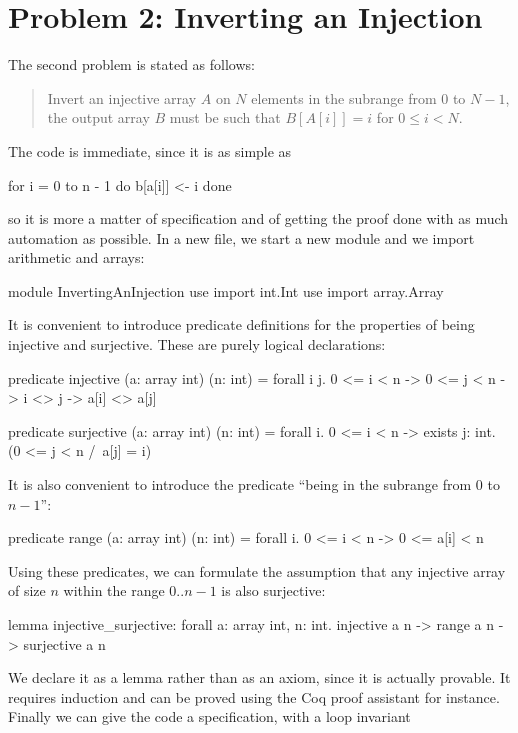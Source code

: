 \section{Problem 2: Inverting an Injection}

The second problem is stated as follows:
\begin{quote}
  Invert an injective array $A$ on $N$ elements in the
  subrange from $0$ to $N - 1$, \ie the output array $B$ must be
  such that $B[A[i]] = i$ for $0 \le i < N$.
\end{quote}
The code is immediate, since it is as simple as
\begin{whycode}
    for i = 0 to n - 1 do b[a[i]] <- i done
\end{whycode}
so it is more a matter of specification and of getting the proof done
with as much automation as possible. In a new file, we start a new
module and we import arithmetic and arrays:
\begin{whycode}
module InvertingAnInjection
  use import int.Int
  use import array.Array
\end{whycode}
It is convenient to introduce predicate definitions for the properties
of being injective and surjective. These are purely logical
declarations:
\begin{whycode}
  predicate injective (a: array int) (n: int) =
    forall i j. 0 <= i < n -> 0 <= j < n -> i <> j -> a[i] <> a[j]

  predicate surjective (a: array int) (n: int) =
    forall i. 0 <= i < n -> exists j: int. (0 <= j < n /\ a[j] = i)
\end{whycode}
It is also convenient to introduce the predicate ``being in the
subrange from 0 to $n-1$'':
\begin{whycode}
  predicate range (a: array int) (n: int) =
    forall i. 0 <= i < n -> 0 <= a[i] < n
\end{whycode}
Using these predicates, we can formulate the assumption that any
injective array of size $n$ within the range $0..n-1$ is also surjective:
\begin{whycode}
  lemma injective_surjective:
    forall a: array int, n: int.
      injective a n -> range a n -> surjective a n
\end{whycode}
We declare it as a lemma rather than as an axiom, since it is actually
provable. It requires induction and can be proved using the Coq proof
assistant for instance.
Finally we can give the code a specification, with a loop invariant
